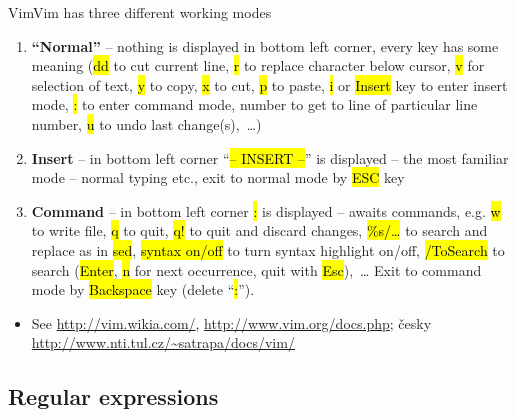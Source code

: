 \documentclass[compress, ucs, xelatex, 11pt, xcolor=svgnames,
  hyperref={
    bookmarks=true,
    unicode=true,
    colorlinks=true,
    pdftitle={Linux, command line and MetaCentrum},
    plainpages=false,
    pdfauthor={Vojtech Zeisek},
    pdfsubject={Course about use of Linux command line, writing shell scripts and using MetaCentrum of CESNET},
    pdfcreator={XeLaTeX},
    pdfkeywords={Linux, GNU, BASH, shell, command line, MetaCentrum},
    linkcolor=DarkRed,
    anchorcolor=DarkBlue,
    citecolor=Indigo,
    filecolor=NavyBlue,
    menucolor=DarkMagenta,
    urlcolor=DarkBlue,
    pdftex},
  url={hyphens, lowtilde} %
  ]{beamer}
\renewcommand{\texttt}[1]{\hl{\ttfamily #1}}
\begin{document}
\begin{frame}{Vim}{Vim has three different working modes}
  \begin{enumerate}
    \item \textbf{``Normal''} -- nothing is displayed in bottom left corner, every key has some meaning (\texttt{dd} to cut current line, \texttt{r} to replace character below cursor, \texttt{v} for selection of text, \texttt{y} to copy, \texttt{x} to cut, \texttt{p} to paste, \texttt{i} or \texttt{Insert} key to enter insert mode, \texttt{:} to enter command mode, number to get to line of particular line number, \texttt{u} to undo last change(s),~\ldots)
    \item \textbf{Insert} -- in bottom left corner ``\texttt{-- INSERT --}'' is displayed -- the most familiar mode -- normal typing etc., exit to normal mode by \texttt{ESC} key
    \item \textbf{Command} -- in bottom left corner \texttt{:} is displayed -- awaits commands, e.g. \texttt{w} to write file, \texttt{q} to quit, \texttt{q!} to quit and discard changes, \texttt{\%s/\ldots} to search and replace as in \texttt{sed}, \texttt{syntax on/off} to turn syntax highlight on/off, \texttt{/ToSearch} to search (\texttt{Enter}, \texttt{n} for next occurrence, quit with \texttt{Esc}),~\ldots{ }Exit to command mode by \texttt{Backspace} key (delete ``\texttt{:}'').
  \end{enumerate}
  \begin{itemize}
    \item See \url{http://vim.wikia.com/}, \url{http://www.vim.org/docs.php}; česky \url{http://www.nti.tul.cz/~satrapa/docs/vim/}
  \end{itemize}
\end{frame}

\subsection{Regular expressions}
\end{document}
